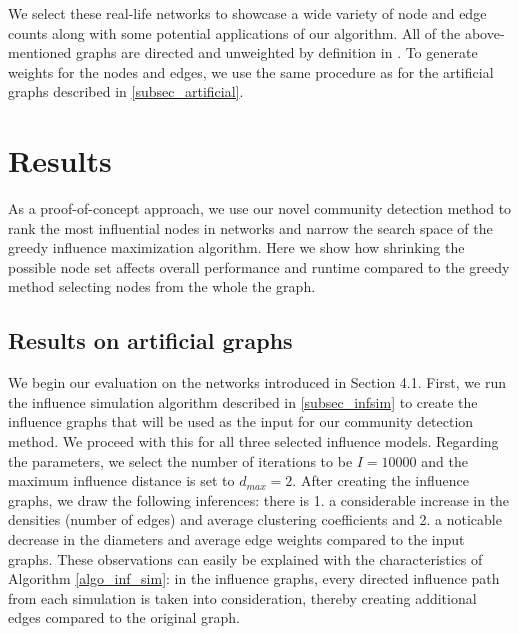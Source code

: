 \documentclass[pdflatex,sn-mathphys-num]{sn-jnl}
\begin{document}
We select these real-life networks to showcase a wide variety of node and edge counts along with some potential applications of our algorithm. All of the above-mentioned graphs are directed and unweighted by definition in \cite{stanfordlarge}. To generate weights for the nodes and edges, we use the same procedure as for the artificial graphs described in \ref{subsec_artificial}.


\section{Results}\label{sec_results}

As a proof-of-concept approach, we use our novel community detection method to rank the most influential nodes in networks and narrow the search space of the greedy influence maximization algorithm. Here we show how shrinking the possible node set affects overall performance and runtime compared to the greedy method selecting nodes from the whole the graph.


\subsection{Results on artificial graphs}\label{subsec_res_artificial}

We begin our evaluation on the networks introduced in Section 4.1. First, we run the influence simulation algorithm described in \ref{subsec_infsim} to create the influence graphs that will be used as the input for our community detection method. We proceed with this for all three selected influence models. Regarding the parameters, we select the number of iterations to be $I = 10000$ and the maximum influence distance is set to $d_{max} = 2$. After creating the influence graphs, we draw the following inferences: there is 1. a considerable increase in the densities (number of edges) and average clustering coefficients and 2. a noticable decrease in the diameters and average edge weights compared to the input graphs. These observations can easily be explained with the characteristics of Algorithm \ref{algo_inf_sim}: in the influence graphs, every directed influence path from each simulation is taken into consideration, thereby creating additional edges compared to the original graph.
\end{document}
